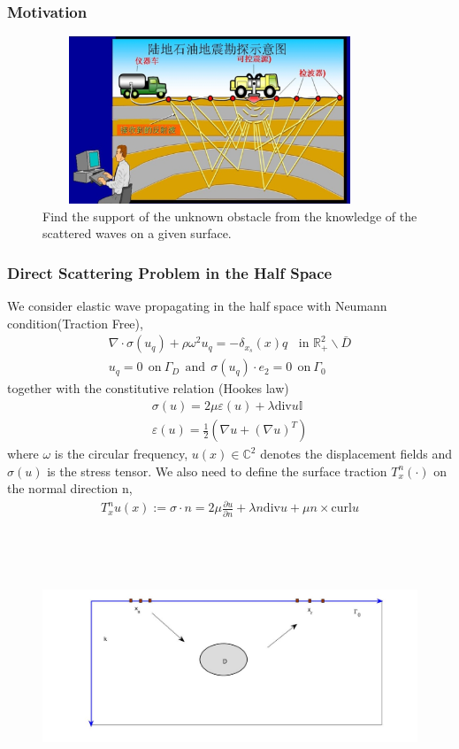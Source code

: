 \documentclass[utf-8,8pt]{beamer}
\newcommand{\R}{\mathbb{R}}
\newcommand{\pa}{\partial}
\newcommand{\ep}{\varepsilon}
\newcommand{\na}{\nabla}
\newcommand{\Ga}{\Gamma}
\newcommand{\bks}{\backslash}
\renewcommand{\C}{{\mathbb{C}}}
\renewcommand{\div}{\mathrm{div}}
\newcommand{\curl}{\mathrm{curl}}
\newcommand{\ben}{\begin{eqnarray*}}
\newcommand{\een}{\end{eqnarray*}}
\begin{document}
\begin{frame}
\frametitle{Motivation}
\begin{figure}

  \includegraphics[width=10cm,height=5cm]{./figure/seismic.png}
  \caption{Find the support of the unknown obstacle from the knowledge of the scattered waves on a given surface.}
\end{figure}
\end{frame}
\begin{frame}
\frametitle{Direct Scattering Problem in the Half Space}
We consider elastic wave propagating in the half space with
Neumann condition(Traction Free),
\ben\label{elastic_eq}
\nabla\cdot\sigma(u_q) + \rho\omega^2u_q= -\delta_{x_s}(x)q \ \ \ \ \mbox{in }\R_+^2\bks \bar{D}\\
u_q=0 \ \ \mbox{on} \ \Ga_D  \ \ \mbox{and} \ \ \sigma(u_q)\cdot e_2=0 \ \ \mbox{on} \ \Ga_0
\een
together with the constitutive relation (Hookes law)
\ben
\sigma(u) = 2\mu\ep(u) + \lambda\div u \mathbb{I} \\
\ep(u)=\frac{1}{2}(\na u +(\na u)^T)
\een
where $\omega$ is the circular frequency, $u(x)\in\C^2$ denotes the displacement fields and $\sigma(u)$ is the stress tensor. We also need to define the surface traction $T_x^n (\cdot)$ on the normal direction n,
\ben
T_x^n u(x) := \sigma\cdot n = 2\mu\frac{\pa u}{\pa n}+\lambda n\div u + \mu n \times \curl u
\een
\end{frame}

\begin{frame}
\begin{figure}
  \centering
  \includegraphics[width=12cm,height=8cm]{./figure/half_forward}
\end{figure}
\end{frame}
\end{document}
